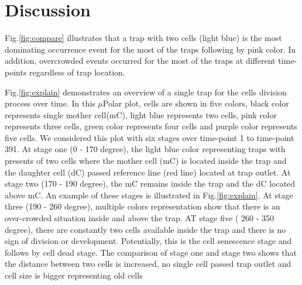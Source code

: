 \documentclass[conference]{IEEEtran}
\begin{document}
\section{Discussion}



Fig.\ref{fig:compare} illustrates that a trap with two cells (light blue) is the most dominating occurrence event for the most of the traps following by pink color. In addition, overcrowded events occurred for the most of the traps at different time-points regardless of trap location. 





Fig.\ref{fig:explain} demonstrates an overview of a single trap for the cells division process over time. In this $\mu$Polar plot, cells are shown in five colors, black color represents single mother cell(mC), light blue represents two cells, pink color represents three cells, green color represents four cells and purple color represents five cells. We considered this plot with six stages over time-point 1 to time-point 391. At stage one (0 - 170 degree), the light blue color representing traps with presents of two cells where the mother cell (mC) is located inside the trap and the daughter cell (dC) passed reference line (red line) located at trap outlet. At stage two (170 - 190 degree), the mC remains inside the trap and the dC located above mC.  An example of these stages is illustrated in Fig.\ref{fig:explain}. At stage three (190 - 260 degree), multiple colors representation show that there is an over-crowded situation inside and above the trap. AT stage five ( 260 - 350 degree), there are constantly two cells available inside the trap and there is no sign of division or development. Potentially, this is the cell senescence stage and follows by cell dead stage. The comparison of stage one and stage two shows that the distance between two cells is increased, no single cell passed trap outlet and cell size is bigger representing old cells    
\end{document}

